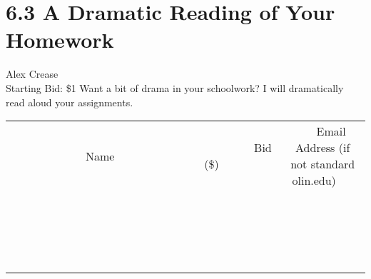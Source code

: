 \documentclass[11pt]{article}
\begin{document}
\section*{6.3 A Dramatic Reading of Your Homework}
Alex Crease
\\
Starting Bid: \$1
\newline
Want a bit of drama in your schoolwork? I will dramatically read aloud your assignments.
\\[3ex]
\begin{tabular}{c c c}
~~~~~~~~~~~~~Name~~~~~~~~~~~~~ & ~~~~~~~~~Bid (\$)~~~~~~~~~  & ~~~Email Address (if not standard olin.edu)~~~\\
 & & \\
\hline
 & & \\
\hline
 & & \\
\hline
 & & \\
\hline
 & & \\
\hline
 & & \\
\hline
 & & \\
\hline
 & & \\
\hline
 & & \\
\hline
 & & \\
\hline
 & & \\
\hline
 & & \\
\hline
 & & \\
\hline
 & & \\
\hline
 & & \\
\hline
 & & \\
\hline
 & & \\
\hline
 & & \\
\hline
 & & \\
\hline
\end{tabular}
\newpage
\end{document}
